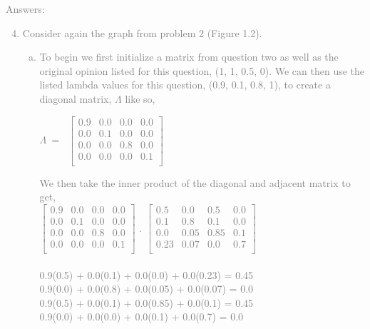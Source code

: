 \documentclass[11pt]{article}
\begin{document}
\textcolor{gray}{
Answers:
\begin{enumerate}
	\setcounter{enumi}{3}
	\item Consider again the graph from problem 2 (Figure 1.2).
	\begin{enumerate}[(a)]
		\item To begin we first initialize a matrix from question two as well as the original opinion listed for this question, (1, 1, 0.5, 0).  We can then use the listed lambda values for this question, (0.9, 0.1, 0.8, 1), to create a diagonal matrix, $\Lambda$ like so,\\
		\begin{center}
		$\Lambda \ = \ $
		$\begin{bmatrix} 
			0.9 & 0.0  & 0.0 & 0.0 \\
			0.0 & 0.1  & 0.0 & 0.0 \\
			0.0 & 0.0  & 0.8 & 0.0 \\
			0.0 & 0.0  & 0.0 & 0.1 \\
		\end{bmatrix}$\\
		\end{center}
We then take the inner product of the diagonal and adjacent matrix to get,\\
		$\begin{bmatrix} 
			0.9 & 0.0  & 0.0 & 0.0 \\
			0.0 & 0.1  & 0.0 & 0.0 \\
			0.0 & 0.0  & 0.8 & 0.0 \\
			0.0 & 0.0  & 0.0 & 0.1 \\
		\end{bmatrix}$
		.
		$\begin{bmatrix} 
			0.5  & 0.0  	& 0.5   & 0.0 \\
			0.1  & 0.8  	& 0.1   & 0.0 \\
			0.0  & 0.05   & 0.85 & 0.1 \\
			0.23 & 0.07  & 0.0 & 0.7 \\ 
		\end{bmatrix}$ \\ \\
		0.9(0.5)  + 0.0(0.1) + 0.0(0.0) + 0.0(0.23) = 0.45  \\
		0.9(0.0)  + 0.0(0.8) + 0.0(0.05) + 0.0(0.07) = 0.0  \\
		0.9(0.5)  + 0.0(0.1) + 0.0(0.85) + 0.0(0.1) = 0.45  \\
		0.9(0.0)  + 0.0(0.0) + 0.0(0.1) + 0.0(0.7) = 0.0 \\

\end{enumerate}
\end{enumerate}}
\end{document}
